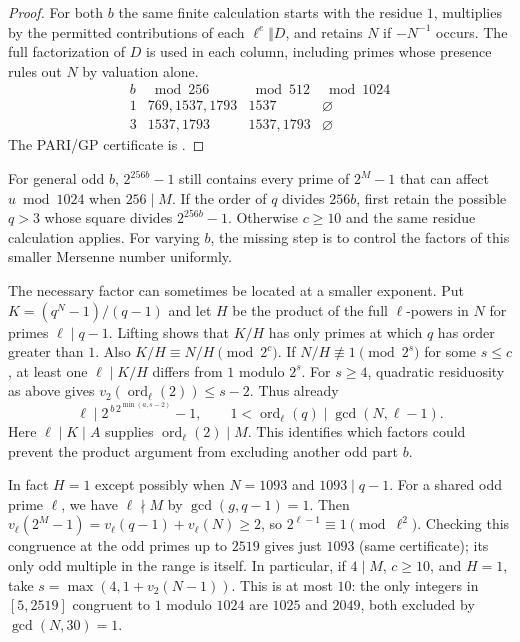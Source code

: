 \documentclass[11pt]{article}
\begin{document}
\begin{proof}
For both $b$ the same finite calculation starts with the residue $1$,
multiplies by the permitted contributions of each $\ell^e\Vert D$,
and retains $N$ if $-N^{-1}$ occurs. The full factorization of $D$
is used in each column, including primes whose presence rules out
$N$ by valuation alone.
\[
\begin{array}{c|c|c|c}
b & \bmod 256 & \bmod 512 & \bmod 1024\\ \hline
1&769,1537,1793&1537&\varnothing\\
3&1537,1793&1537,1793&\varnothing
\end{array}
\]
The PARI/GP certificate is .
\end{proof}

For general odd $b$, $2^{256b}-1$ still contains every prime of
$2^M-1$ that can affect $u\bmod1024$ when $256\mid M$.
If the order of $q$ divides $256b$, first retain the possible
$q>3$ whose square divides $2^{256b}-1$. Otherwise $c\ge10$
and the same residue calculation applies. For varying $b$,
the missing step is to control the factors of this smaller Mersenne
number uniformly.

The necessary factor can sometimes be located at a smaller exponent.
Put $K=(q^N-1)/(q-1)$ and let $H$ be the product of the full
$\ell$-powers in $N$ for primes $\ell\mid q-1$. Lifting shows that
$K/H$ has only primes at which $q$ has order greater than $1$.
Also $K/H\equiv N/H\pmod{2^c}$. If $N/H\not\equiv1\pmod{2^s}$
for some $s\le c$, at least one $\ell\mid K/H$ differs from $1$
modulo $2^s$. For $s\ge4$, quadratic residuosity as above gives
$v_2(\operatorname{ord}_\ell(2))\le s-2$. Thus already
\[
 \ell\mid 2^{\,b\,2^{\min(a,s-2)}}-1,\qquad
 1<\operatorname{ord}_\ell(q)\mid\gcd(N,\ell-1).
\]
Here $\ell\mid K\mid A$ supplies $\operatorname{ord}_\ell(2)\mid M$.
This identifies which factors could prevent the product argument
from excluding another odd part $b$.

In fact $H=1$ except possibly when $N=1093$ and $1093\mid q-1$.
For a shared odd prime $\ell$, we have $\ell\nmid M$ by
$\gcd(g,q-1)=1$. Then $v_\ell(2^M-1)=v_\ell(q-1)+v_\ell(N)\ge2$,
so $2^{\ell-1}\equiv1\pmod{\ell^2}$. Checking this congruence at
the odd primes up to $2519$ gives just $1093$ (same certificate);
its only odd multiple in the range is itself. In particular, if
$4\mid M$, $c\ge10$, and $H=1$, take
$s=\max(4,1+v_2(N-1))$. This is at most $10$: the only integers
in $[5,2519]$ congruent to $1$ modulo $1024$ are $1025$ and
$2049$, both excluded by $\gcd(N,30)=1$.
\end{document}
